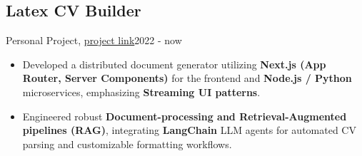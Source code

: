 \subsection{Latex CV Builder}{Personal Project, \href{https://github.com/Danial-Kord/Latex-CV-Builder}{project link}}{2022 - now}
\begin{itemize}
    \item Developed a distributed document generator utilizing \textbf{Next.js (App Router, Server Components)} for the frontend and \textbf{Node.js / Python} microservices, emphasizing \textbf{Streaming UI patterns}.
    \item Engineered robust \textbf{Document-processing and Retrieval-Augmented pipelines (RAG)}, integrating \textbf{LangChain} LLM agents for automated CV parsing and customizable formatting workflows.
\end{itemize}
